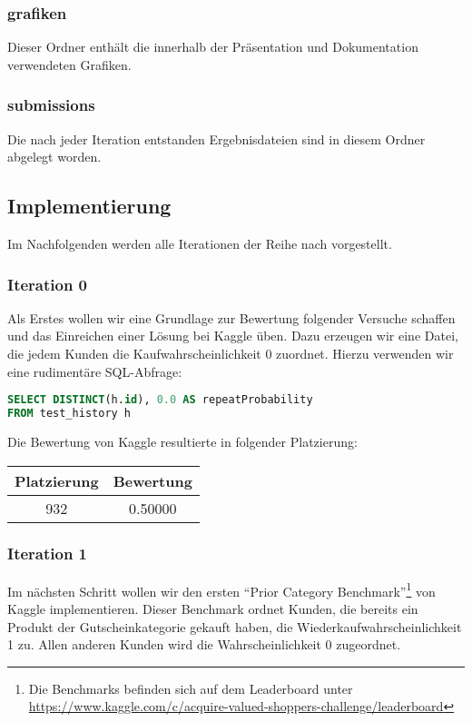 \subsubsection{grafiken}
Dieser Ordner enthält die innerhalb der Präsentation und Dokumentation verwendeten Grafiken.

\subsubsection{submissions}
Die nach jeder Iteration entstanden Ergebnisdateien sind in diesem Ordner abgelegt worden.

\subsection{Implementierung}
Im Nachfolgenden werden alle Iterationen der Reihe nach vorgestellt.

\subsubsection{Iteration 0}
\label{sec:iteration0}

Als Erstes wollen wir eine Grundlage zur Bewertung folgender Versuche schaffen und das Einreichen einer
Lösung bei Kaggle üben. Dazu erzeugen wir eine Datei, die jedem Kunden die Kaufwahrscheinlichkeit 0
zuordnet. Hierzu verwenden wir eine rudimentäre SQL-Abfrage:

\begin{lstlisting}[language=SQL]
SELECT DISTINCT(h.id), 0.0 AS repeatProbability 
FROM test_history h
\end{lstlisting}

Die Bewertung von Kaggle resultierte in folgender Platzierung:

\begin{tabular}{|c|c|}
	\hline \textbf{Platzierung} & \textbf{Bewertung} \\ 
	\hline 932 & 0.50000  \\ 
	\hline 
\end{tabular}

\subsubsection{Iteration 1}

Im nächsten Schritt wollen wir den ersten "`Prior Category Benchmark"'\footnote{Die Benchmarks befinden sich auf dem Leaderboard unter \\
\url{https://www.kaggle.com/c/acquire-valued-shoppers-challenge/leaderboard}} von Kaggle implementieren.
Dieser Benchmark ordnet Kunden, die bereits ein Produkt der Gutscheinkategorie gekauft haben, 
die Wiederkaufwahrscheinlichkeit 1 zu. Allen anderen Kunden wird die Wahrscheinlichkeit 0 zugeordnet.

